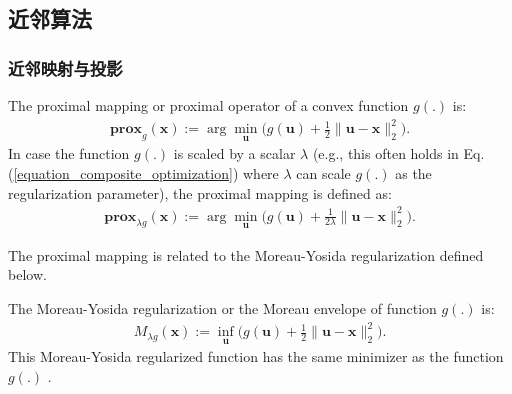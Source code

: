\documentclass[lang=cn,10pt]{gorgeousnbook}
\numberwithin{equation}{section}%
\numberwithin{figure}{section}%
\begin{document}
\subsection{近邻算法}\label{section_proximal_methods}


\subsubsection{近邻映射与投影}

\begin{definition}
The proximal mapping or proximal operator of a convex function $g(.)$ is:
\begin{align}\label{equation_proximal_mapping}
\textbf{prox}_g(\boldsymbol{x}) := \arg\min_{\boldsymbol{u}} \Big( g(\boldsymbol{u}) + \frac{1}{2} \|\boldsymbol{u} - \boldsymbol{x}\|_2^2 \Big).
\end{align}
In case the function $g(.)$ is scaled by a scalar $\lambda$ (e.g., this often holds in Eq. (\ref{equation_composite_optimization}) where $\lambda$ can scale $g(.)$ as the regularization parameter), the proximal mapping is defined as:
\begin{align}\label{equation_proximal_mapping_scaled}
\textbf{prox}_{\lambda g}(\boldsymbol{x}) := \arg\min_{\boldsymbol{u}} \Big( g(\boldsymbol{u}) + \frac{1}{2\lambda} \|\boldsymbol{u} - \boldsymbol{x}\|_2^2 \Big).
\end{align}
\end{definition}

The proximal mapping is related to the Moreau-Yosida regularization defined below. 
\begin{definition}\label{definition_Moreau_envelope}
The Moreau-Yosida regularization or the Moreau envelope of function $g(.)$ is:
\begin{align}\label{equation_Moreau_envelope}
M_{\lambda g}(\boldsymbol{x}) := \inf_{\boldsymbol{u}} \Big( g(\boldsymbol{u}) + \frac{1}{2} \|\boldsymbol{u} - \boldsymbol{x}\|_2^2 \Big).
\end{align}
This Moreau-Yosida regularized function has the same minimizer as the function $g(.)$ \cite{lemarechal1997practical}. 
\end{definition}
\end{document}
